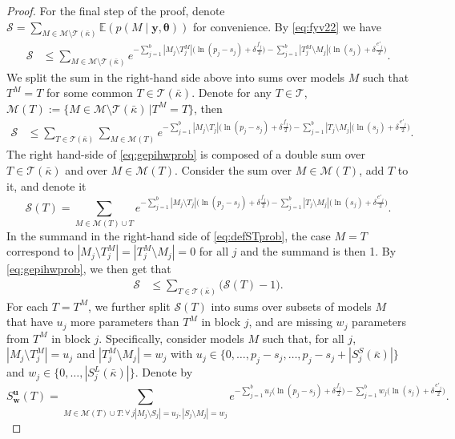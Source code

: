 \documentclass[
  12pt]{article}
\newcommand{\E}{\mathbb{E}}
\newcommand{\M}{\mathcal{M}}
\newcommand{\T}{\mathcal{T}}
\newcommand{\by}{\mathbf{y}}
\newcommand{\bu}{\mathbf{u}}
\newcommand{\bw}{\mathbf{w}}
\newcommand{\btheta}{\boldsymbol{\theta}}
\begin{document}
\begin{proof}
For the final step of the proof, denote $\mathcal{S}= \sum_{M \in \M\setminus \T(\bar{\kappa})} \E\left(p(M\mid \by, \btheta)\right)$ for convenience. By \eqref{eq:fyv22} we have
\begin{align*}
    \mathcal{S} &\leq \sum_{M \in \M\setminus \T(\bar{\kappa})}e^{- \sum_{j=1}^b |M_j\setminus T^M_j|\big(\ln(p_j-s_j)+\delta \tfrac{f_j}{2}\big)-\sum_{j=1}^b |T^M_j\setminus M_j|\big(\ln(s_j)+\delta \tfrac{e'_j}{2}\big)}.
\end{align*}
We split the sum in the right-hand side above into sums over models $M$ %
such that $T^M=T$ for some common $T\in \T(\bar{\kappa})$. Denote for any $T\in \T$,\, $\M(T):=\{M \in \M\setminus \T(\bar{\kappa}) \,| T^M=T\}$, then
\begin{align}\label{eq:gepihwprob}
    \mathcal{S} &\leq \sum_{T \in \T(\bar{\kappa})}\sum_{M \in \M(T)}e^{- \sum_{j=1}^b |M_j\setminus T_j|\big(\ln(p_j-s_j)+\delta \tfrac{f_j}{2}\big)-\sum_{j=1}^b |T_j\setminus M_j|\big(\ln(s_j)+\delta \tfrac{e'_j}{2}\big)}.
\end{align}
The right hand-side of \eqref{eq:gepihwprob} is composed of a double sum over $T \in \T(\bar{\kappa})$ and over $M \in \M(T)$. Consider the sum over $M \in \M(T)$, add $T$ to it, and denote it
\begin{equation}\label{eq:defSTprob}
  \mathcal{S}(T)=\sum_{M \in \M(T) \cup T}e^{- \sum_{j=1}^b |M_j\setminus T_j|\big(\ln(p_j-s_j)+\delta \tfrac{f_j}{2}\big)-\sum_{j=1}^b |T_j\setminus M_j|\big(\ln(s_j)+\delta \tfrac{e'_j}{2}\big)}.
\end{equation}
In the summand in the right-hand side of \eqref{eq:defSTprob}, the case $M=T$ correspond to $|M_j\setminus T^M_j|=|T^M_j\setminus M_j|=0$ for all $j$ and the summand is then 1.
By \eqref{eq:gepihwprob}, we then get that
\begin{align}\label{eq:gepihwprob2prob}
    \mathcal{S} &\leq \sum_{T \in \T(\bar{\kappa})}\big(\mathcal{S}(T)-1\big).
\end{align}
For each $T=T^M$, we further split $\mathcal{S}(T)$ into sums over subsets of models $M$ that have $u_j$ more parameters than $T^M$ in block $j$, and are missing $w_j$ parameters from $T^M$ in block $j$.
Specifically, consider models $M$ such that, for all $j$, $|M_j\setminus T^M_j|=u_j$ and $|T^M_j\setminus M_j|=w_j$ with $u_j \in \{0,\ldots,p_j-s_j,\ldots,p_j-s_j+|S_j^{S}(\bar{\kappa})|\}$ and $w_j \in \{0,\ldots,|S^{L}_j(\bar{\kappa})|\}$. Denote by
$$S^{\bu}_{\bw}(T)=\sum_{M \in \M(T) \cup T:\forall \,j |M_j\setminus S_j|=u_j, |S_j\setminus M_j|=w_j } e^{- \sum_{j=1}^b u_j\big(\ln(p_j-s_j)+\delta \tfrac{f_j}{2}\big)-\sum_{j=1}^b w_j\big(\ln(s_j)+\delta \tfrac{e'_j}{2}\big)}.$$

\end{proof}
\end{document}
